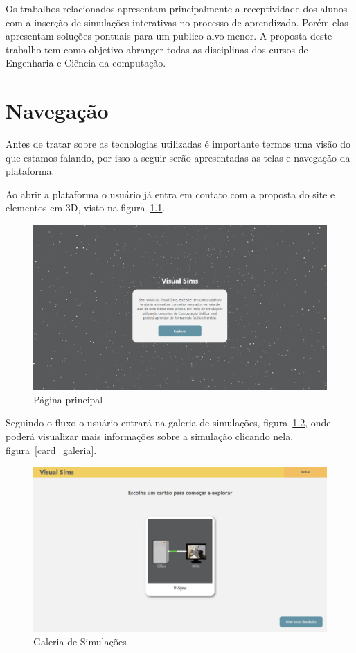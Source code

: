 \documentclass[tcc,capa]{texufpel}
\begin{document}
Os trabalhos relacionados apresentam principalmente a receptividade dos alunos com a inserção de simulações interativas no processo de aprendizado. Porém elas apresentam soluções pontuais para um publico alvo menor. A proposta deste trabalho tem como objetivo abranger todas as disciplinas dos cursos de Engenharia e Ciência da computação. 

\chapter{Navegação}
\label{cap: navegacao}

Antes de tratar sobre as tecnologias utilizadas é importante termos uma visão do que estamos falando, por isso a seguir serão apresentadas as telas e navegação da plataforma.

Ao abrir a plataforma o usuário já entra em contato com a proposta do site e elementos em 3D, visto na figura~\ref{home}. 

\begin{figure}[htbp]
  \centering \includegraphics[scale=.2]{Navegacao/pagina_home.jpeg}
  \caption{Página principal}
  \label{home}
\end{figure}

Seguindo o fluxo o usuário entrará na galeria de simulações, figura~\ref{galeria}, onde poderá visualizar mais informações sobre a simulação clicando nela, figura~\ref{card_galeria}.

\begin{figure}[htbp]
  \centering \includegraphics[scale=.2]{Navegacao/pagina_galeria.jpeg}
  \caption{Galeria de Simulações}
  \label{galeria}
\end{figure}
\end{document}
